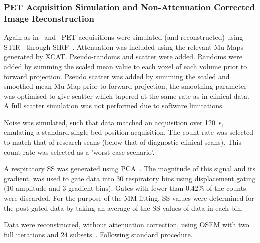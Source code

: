             \subsubsection{PET Acquisition Simulation and Non-Attenuation Corrected Image Reconstruction} \label{sec:comparison_of_motion_correction_methods_incorporating_motion_modelling_for_pet_ct_using_a_single_breath_hold_attenuation_map_pet_acquisition_simulation_and_non_attenuation_corrected_image_reconstruction}
                Again as in~ and~ \gls{PET} acquisitions were simulated (and reconstructed) using \gls{STIR}~\parencite{Thielemans2012, Nikos2019} through \gls{SIRF}~\parencite{Ovtchinnikov2017}. Attenuation was included using the relevant \glspl{Mu-Map} generated by \gls{XCAT}. Pseudo-randoms and scatter were added. Randoms were added by summing the scaled mean value to each voxel of each volume prior to forward projection. Pseudo scatter was added by summing the scaled and smoothed mean \gls{Mu-Map} prior to forward projection, the smoothing parameter was optimised to give scatter which tapered at the same rate as in clinical data. A full scatter simulation was not performed due to software limitations.
                
                Noise was simulated, such that data matched an acquisition over \SI{120}{\second}, emulating a standard single bed position acquisition. The count rate was selected to match that of research scans (below that of diagnostic clinical scans). This count rate was selected as a 'worst case scenario'.
                
                A respiratory \gls{SS} was generated using \gls{PCA}~\parencite{Thielemans2011}. The magnitude of this signal and its gradient, was used to gate data into $30$ respiratory bins using displacement gating ($10$ amplitude and $3$ gradient bins). Gates with fewer than $0.42$\% of the counts were discarded. For the purpose of the \gls{MM} fitting, \gls{SS} values were determined for the post-gated data by taking an average of the \gls{SS} values of data in each bin.
                
                Data were reconstructed, without attenuation correction, using \gls{OSEM} with two full iterations and $24$ subsets~\parencite{Hudson1994}. Following standard procedure.
            
